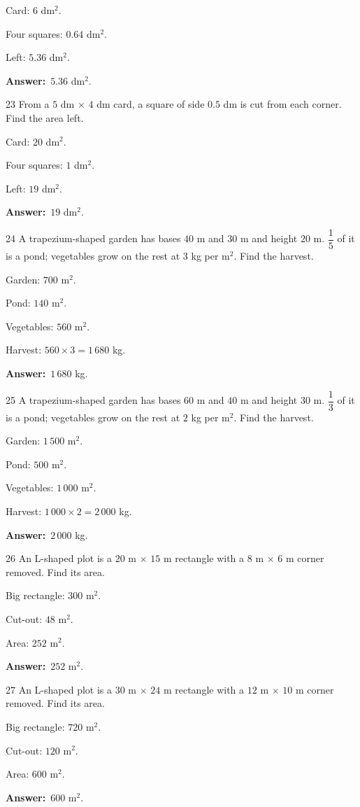 \documentclass[11pt]{article}
\newif\ifsol \solfalse
\providecommand{\AnsWord}{Đáp số}
\newcommand{\dapso}[1]{\par\textbf{\AnsWord:}\ #1}
\newcommand{\probsol}[1]{%
  \begin{lrbox}{\solmeasure}\begin{minipage}{\dimexpr\linewidth-24pt\relax}#1\end{minipage}\end{lrbox}%
  \ifsol
    \begin{solbox}#1\end{solbox}%
  \else
    \setlength{\solht}{\dimexpr\ht\solmeasure+\dp\solmeasure+0.85cm\relax}%
    \ifdim\solht<1.35cm\setlength{\solht}{1.35cm}\fi
    \begin{tcolorbox}[colback=white,colframe=Line,boxrule=0.8pt,arc=5pt,
      left=8pt,right=8pt,top=4pt,bottom=4pt,height=\solht]{\footnotesize\color{Slate}\itshape\WorkWord}\end{tcolorbox}%
  \fi}
\newcommand{\gap}{\vspace{0.3cm}}
\def\WorkWord{Your work:}
\def\AnsWord{Answer}
\begin{document}
\probsol{
Card: $6$ dm$^2$.\par Four squares: $0.64$ dm$^2$.\par Left: $5.36$ dm$^2$.
\dapso{$5.36$ dm$^2$.}}
\gap
\begin{probbox}{23}{\relax}
From a $5$ dm $\times$ $4$ dm card, a square of side $0.5$ dm is cut from each corner. Find the area left.
\end{probbox}
\probsol{
Card: $20$ dm$^2$.\par Four squares: $1$ dm$^2$.\par Left: $19$ dm$^2$.
\dapso{$19$ dm$^2$.}}
\gap
\begin{probbox}{24}{\relax}
A trapezium-shaped garden has bases $40$ m and $30$ m and height $20$ m. $\dfrac{1}{5}$ of it is a pond; vegetables grow on the rest at $3$ kg per m$^2$. Find the harvest.
\end{probbox}
\probsol{
Garden: $700$ m$^2$.\par Pond: $140$ m$^2$.\par Vegetables: $560$ m$^2$.\par Harvest: $560\times3=1\,680$ kg.
\dapso{$1\,680$ kg.}}
\gap
\begin{probbox}{25}{\relax}
A trapezium-shaped garden has bases $60$ m and $40$ m and height $30$ m. $\dfrac{1}{3}$ of it is a pond; vegetables grow on the rest at $2$ kg per m$^2$. Find the harvest.
\end{probbox}
\probsol{
Garden: $1\,500$ m$^2$.\par Pond: $500$ m$^2$.\par Vegetables: $1\,000$ m$^2$.\par Harvest: $1\,000\times2=2\,000$ kg.
\dapso{$2\,000$ kg.}}
\gap
\begin{probbox}{26}{\relax}
An L-shaped plot is a $20$ m $\times$ $15$ m rectangle with a $8$ m $\times$ $6$ m corner removed. Find its area.
\end{probbox}
\probsol{
Big rectangle: $300$ m$^2$.\par Cut-out: $48$ m$^2$.\par Area: $252$ m$^2$.
\dapso{$252$ m$^2$.}}
\gap
\begin{probbox}{27}{\relax}
An L-shaped plot is a $30$ m $\times$ $24$ m rectangle with a $12$ m $\times$ $10$ m corner removed. Find its area.
\end{probbox}
\probsol{
Big rectangle: $720$ m$^2$.\par Cut-out: $120$ m$^2$.\par Area: $600$ m$^2$.
\dapso{$600$ m$^2$.}}
\end{document}
